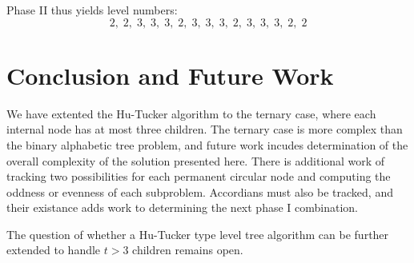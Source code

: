 \documentclass[12pt]{article}
\begin{document}
\vspace{.15in}
\noindent Phase II thus yields level numbers:
$$2,\;2,\;3,\;3,\;3,\;2,\;3,\;3,\;3,\;2,\;3,\;3,\;3,\;2,\;2$$

\section{Conclusion and Future Work}

We have extented the Hu-Tucker algorithm to the ternary case, where each
internal node has at most three children.  The ternary case is more complex than
the binary alphabetic tree problem, and future work incudes determination of the 
overall complexity of the solution presented here. There is additional work of 
tracking two possibilities for each permanent circular node and computing the 
oddness or evenness of each subproblem. Accordians must also be tracked, 
and their existance adds work to determining the next phase I combination.

The question of whether a Hu-Tucker type level tree algorithm can be further 
extended to handle $t > 3$ children remains open.



\end{document}
